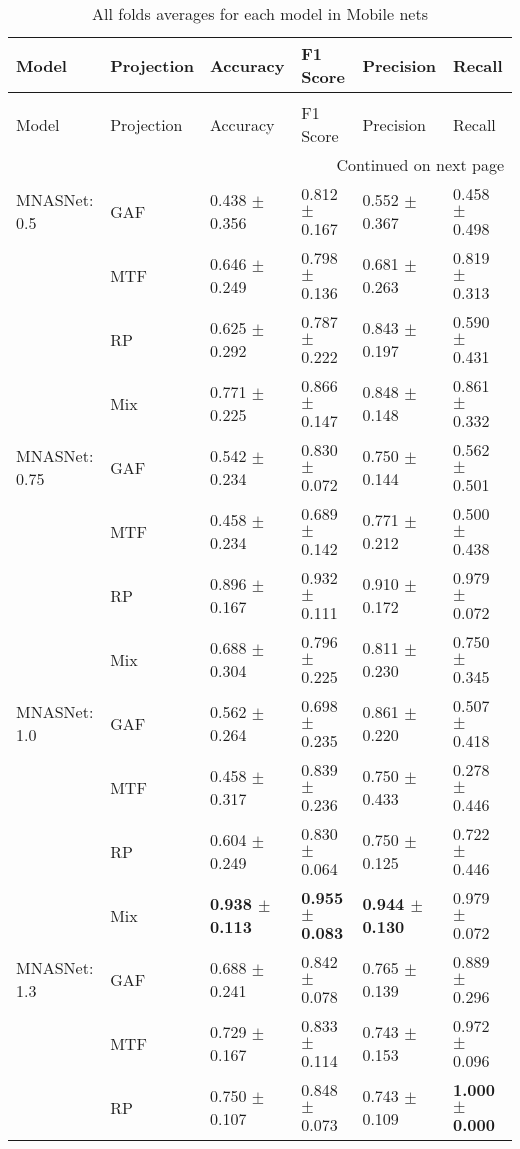 \begin{longtable}[t]{llllll}
\caption{All folds averages for each model in Mobile nets} \\
\toprule
Model & Projection & Accuracy & F1 Score & Precision & Recall \\
\midrule
\endfirsthead
\caption[]{All folds averages for each model in Mobile nets} \\
\toprule
Model & Projection & Accuracy & F1 Score & Precision & Recall \\
\midrule
\endhead
\midrule
\multicolumn{6}{r}{Continued on next page} \\
\midrule
\endfoot
\bottomrule
\endlastfoot
MNASNet: 0.5 & GAF & 0.438 $\pm$ 0.356 & 0.812 $\pm$ 0.167 & 0.552 $\pm$ 0.367 & 0.458 $\pm$ 0.498 \\
 & MTF & 0.646 $\pm$ 0.249 & 0.798 $\pm$ 0.136 & 0.681 $\pm$ 0.263 & 0.819 $\pm$ 0.313 \\
 & RP & 0.625 $\pm$ 0.292 & 0.787 $\pm$ 0.222 & 0.843 $\pm$ 0.197 & 0.590 $\pm$ 0.431 \\
 & Mix & 0.771 $\pm$ 0.225 & 0.866 $\pm$ 0.147 & 0.848 $\pm$ 0.148 & 0.861 $\pm$ 0.332 \\
MNASNet: 0.75 & GAF & 0.542 $\pm$ 0.234 & 0.830 $\pm$ 0.072 & 0.750 $\pm$ 0.144 & 0.562 $\pm$ 0.501 \\
 & MTF & 0.458 $\pm$ 0.234 & 0.689 $\pm$ 0.142 & 0.771 $\pm$ 0.212 & 0.500 $\pm$ 0.438 \\
 & RP & 0.896 $\pm$ 0.167 & 0.932 $\pm$ 0.111 & 0.910 $\pm$ 0.172 & 0.979 $\pm$ 0.072 \\
 & Mix & 0.688 $\pm$ 0.304 & 0.796 $\pm$ 0.225 & 0.811 $\pm$ 0.230 & 0.750 $\pm$ 0.345 \\
MNASNet: 1.0 & GAF & 0.562 $\pm$ 0.264 & 0.698 $\pm$ 0.235 & 0.861 $\pm$ 0.220 & 0.507 $\pm$ 0.418 \\
 & MTF & 0.458 $\pm$ 0.317 & 0.839 $\pm$ 0.236 & 0.750 $\pm$ 0.433 & 0.278 $\pm$ 0.446 \\
 & RP & 0.604 $\pm$ 0.249 & 0.830 $\pm$ 0.064 & 0.750 $\pm$ 0.125 & 0.722 $\pm$ 0.446 \\
 & Mix & \textbf{0.938 $\pm$ 0.113} & \textbf{0.955 $\pm$ 0.083} & \textbf{0.944 $\pm$ 0.130} & 0.979 $\pm$ 0.072 \\
MNASNet: 1.3 & GAF & 0.688 $\pm$ 0.241 & 0.842 $\pm$ 0.078 & 0.765 $\pm$ 0.139 & 0.889 $\pm$ 0.296 \\
 & MTF & 0.729 $\pm$ 0.167 & 0.833 $\pm$ 0.114 & 0.743 $\pm$ 0.153 & 0.972 $\pm$ 0.096 \\
 & RP & 0.750 $\pm$ 0.107 & 0.848 $\pm$ 0.073 & 0.743 $\pm$ 0.109 & \textbf{1.000 $\pm$ 0.000} \\

\end{longtable}
